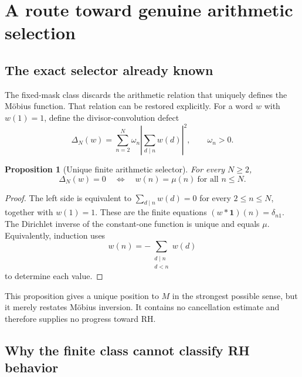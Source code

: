 \documentclass[11pt,reqno]{amsart}
\numberwithin{equation}{section}
\theoremstyle{plain}
\newtheorem{proposition}[theorem]{Proposition}
\theoremstyle{definition}
\theoremstyle{remark}
\begin{document}
\section{A route toward genuine arithmetic selection}
\label{sec:selection-route}

\subsection{The exact selector already known}
\label{subsec:exact-arithmetic-selector}

The fixed-mask class discards the arithmetic relation that uniquely defines
the M\"obius function.  That relation can be restored explicitly.  For a word
\(w\) with \(w(1)=1\), define the divisor-convolution defect
\begin{equation}
\Delta_N(w)
=\sum_{n=2}^{N}\omega_n
\left|\sum_{d\mid n}w(d)\right|^2,
\qquad \omega_n>0.
\label{eq:divisor-convolution-defect}
\end{equation}

\begin{proposition}[Unique finite arithmetic selector]
\label{prop:unique-arithmetic-selector}
For every \(N\geq2\),
\begin{equation}
\Delta_N(w)=0
\quad\Longleftrightarrow\quad
w(n)=\mu(n)\ \text{for all }n\leq N.
\label{eq:unique-arithmetic-selection}
\end{equation}
\end{proposition}

\begin{proof}
The left side is equivalent to
\(\sum_{d\mid n}w(d)=0\) for every \(2\leq n\leq N\), together with
\(w(1)=1\).  These are the finite equations
\((w*\mathbf 1)(n)=\delta_{n1}\).  The Dirichlet inverse of the constant-one
function is unique and equals \(\mu\).  Equivalently, induction uses
\begin{equation}
w(n)=-\sum_{\substack{d\mid n\\d<n}}w(d)
\label{eq:mobius-recursion}
\end{equation}
to determine each value.
\end{proof}

This proposition gives a unique position to \(M\) in the strongest possible
sense, but it merely restates M\"obius inversion.  It contains no cancellation
estimate and therefore supplies no progress toward RH.

\subsection{Why the finite class cannot classify RH behavior}
\label{subsec:finite-class-rh-classification}
\end{document}
